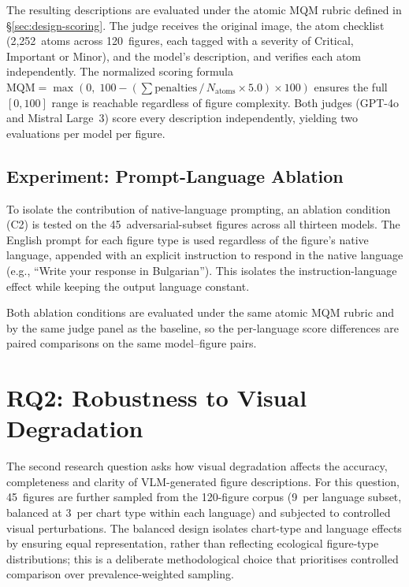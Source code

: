 The resulting descriptions are evaluated under the atomic MQM
rubric defined in \S\ref{sec:design-scoring}. The judge
receives the original image, the atom checklist (2{,}252~atoms
across 120~figures, each tagged with a severity of Critical,
Important or Minor), and the model's description, and verifies
each atom independently. The normalized scoring formula
$\mathrm{MQM} = \max(0,\; 100 - (\sum\mathrm{penalties}\,/\,
N_{\mathrm{atoms}} \times 5.0) \times 100)$ ensures the full
$[0, 100]$ range is reachable regardless of figure complexity.
Both judges (GPT-4o and Mistral Large~3) score every
description independently, yielding two evaluations per model
per figure.

\subsection{Experiment: Prompt-Language Ablation}
\label{sec:impl-rq1-ablation}

To isolate the contribution of native-language prompting, an
ablation condition (C2) is tested on the 45~adversarial-subset
figures across all thirteen models. The English prompt for each
figure type is used regardless of the figure's native language,
appended with an explicit instruction to respond in the native
language (e.g., ``Write your response in Bulgarian''). This
isolates the instruction-language effect while keeping the
output language constant.

Both ablation conditions are evaluated under the same atomic
MQM rubric and by the same judge panel as the baseline, so
the per-language score differences are paired comparisons on
the same model--figure pairs.


\section{RQ2: Robustness to Visual Degradation}
\label{sec:impl-rq2}

The second research question asks how visual degradation affects
the accuracy, completeness and clarity of VLM-generated figure
descriptions. For this question, 45~figures are further sampled
from the 120-figure corpus (9~per language subset, balanced at 3~per chart type within each language) and subjected
to controlled visual perturbations. The balanced design isolates chart-type and language effects by ensuring equal representation, rather than reflecting ecological figure-type distributions; this is a deliberate methodological choice that prioritises controlled comparison over prevalence-weighted sampling.

